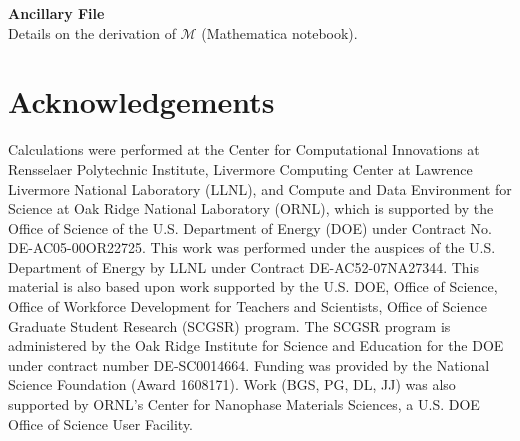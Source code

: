 \documentclass{article}
\begin{document}
\medskip\noindent
{\bf Ancillary File}\\
\noindent
Details on the derivation of $\mathcal{M}$ (Mathematica notebook).

\section{Acknowledgements}
\label{sec:acknowledgements}

Calculations were performed at the Center for Computational Innovations at
Rensselaer Polytechnic Institute, Livermore Computing Center at Lawrence
Livermore National Laboratory (LLNL), and Compute and Data Environment for
Science at Oak Ridge National Laboratory (ORNL), which is supported by the
Office of Science of the U.S. Department of Energy (DOE) under Contract No.
DE-AC05-00OR22725.
This work was performed under the auspices of the U.S. Department of Energy by
LLNL under Contract DE-AC52-07NA27344.
This material is also based upon work supported by the U.S. DOE, Office of
Science, Office of Workforce Development for Teachers and Scientists, Office of
Science Graduate Student Research (SCGSR) program.
The SCGSR program is administered by the Oak Ridge Institute for Science and
Education for the DOE under contract number DE‐SC0014664.
Funding was provided by the National Science Foundation (Award 1608171).  Work
(BGS, PG, DL, JJ) was also supported by ORNL's Center for Nanophase Materials
Sciences, a U.S. DOE Office of Science User Facility.



% 
\end{document}
